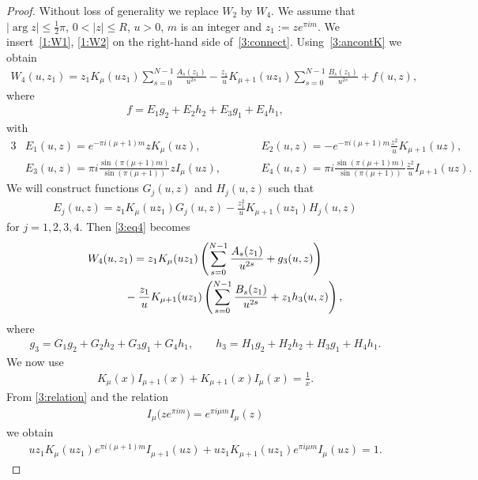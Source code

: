 \documentclass[11pt]{article}
\numberwithin{equation}{section}
\begin{document}
\begin{proof}
Without loss of generality we replace $W_2$ by $W_4$. We assume that $|\arg z|\le \frac12\pi$, $0<|z|\le R$, $u>0$, $m$ is an integer and $z_1:=ze^{\pi im}$.
We insert~\eqref{1:W1}, \eqref{1:W2} on the right-hand side of~\eqref{3:connect}.
Using~\eqref{3:ancontK} we obtain
\begin{gather}\label{3:eq4}
W_4(u,z_1)=z_1K_\mu(uz_1)\sum_{s=0}^{N-1} \frac{A_s(z_1)}{u^{2s}}
-\frac{z_1}{u}K_{\mu+1}(uz_1)\sum_{s=0}^{N-1} \frac{B_s(z_1)}{u^{2s}}+f(u,z),
\end{gather}
where
\begin{gather*}%
 f=E_1g_2+E_2h_2+E_3g_1+E_4h_1,
\end{gather*}
with
\begin{alignat*}{3}
& E_1(u,z) = e^{-\pi i(\mu+1)m} zK_\mu(uz),\qquad &&
 E_2(u,z) = -e^{-\pi i (\mu+1)m}\frac{z^2}{u} K_{\mu+1}(uz),&\\
& E_3(u,z) = \pi i\frac{\sin(\pi(\mu+1)m)}{\sin(\pi(\mu+1))}z I_\mu(uz),\qquad&&
 E_4(u,z) = \pi i \frac{\sin(\pi (\mu+1)m)}{\sin(\pi (\mu+1))}\frac{z^2}{u}I_{\mu+1}(uz) .&
\end{alignat*}
We will construct functions $G_j(u,z)$ and $H_j(u,z)$ such that
\begin{gather*} E_j(u,z)=z_1 K_\mu(uz_1) G_j(u,z)-\frac{z_1^2}{u} K_{\mu+1}(uz_1) H_j(u,z)
\end{gather*}
for $j=1,2,3,4$.
Then \eqref{3:eq4} becomes
\begin{gather}
W_4(u,z_1)=z_1K_\mu(uz_1)\left(\sum_{s=0}^{N-1} \frac{A_s(z_1)}{u^{2s}}+g_3(u,z)\right)\nonumber\\
\hphantom{W_4(u,z_1)=}{}
-\frac{z_1}{u}K_{\mu+1}(uz_1)\left(\sum_{s=0}^{N-1} \frac{B_s(z_1)}{u^{2s}}+z_1h_3(u,z)\right),\label{4:eq5}
\end{gather}
where
\begin{gather*}
g_3 = G_1 g_2+G_2h_2+G_3 g_1+G_4 h_1,\qquad
h_3 = H_1 g_2+H_2h_2+H_3 g_1+H_4 h_1.
\end{gather*}
We now use \cite[(10.28.2)]{NIST}
\begin{gather}\label{3:relation}
 K_\mu(x)I_{\mu+1}(x)+K_{\mu+1}(x)I_\mu(x)=\frac1x .
\end{gather}
From \eqref{3:relation} and the relation
\begin{gather}\label{3:ancontI}
 I_\mu\big(ze^{\pi im}\big)=e^{\pi i\mu m}I_\mu(z)
\end{gather}
we obtain
\begin{gather*} u z_1K_\mu(uz_1) e^{\pi i (\mu+1)m} I_{\mu+1}(uz)+uz_1K_{\mu+1}(uz_1) e^{\pi i \mu m} I_\mu(uz)=1 .\end{gather*}

\end{proof}
\end{document}

